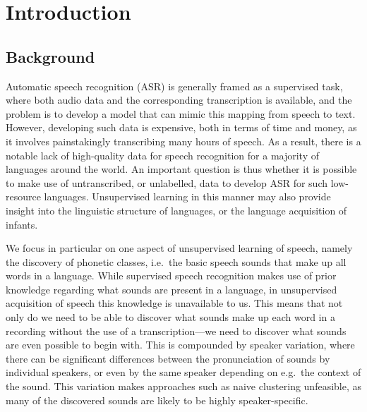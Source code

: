 %
%
%

\chapter{Introduction}
\section{Background}
Automatic speech recognition (ASR) is generally framed as a supervised task, where both audio data and the corresponding transcription is available, and the problem is to develop a model that can mimic this mapping from speech to text.
However, developing such data is expensive, both in terms of time and money, as it involves painstakingly transcribing many hours of speech.
As a result, there is a notable lack of high-quality data for speech recognition for a majority of languages around the world.
An important question is thus whether it is possible to make use of untranscribed, or unlabelled, data to develop ASR for such low-resource languages.
Unsupervised learning in this manner may also provide insight into the linguistic structure of languages, or the language acquisition of infants.

We focus in particular on one aspect of unsupervised learning of speech, namely the discovery of phonetic classes, i.e.\ the basic speech sounds that make up all words in a language.
While supervised speech recognition makes use of prior knowledge regarding what sounds are present in a language, in unsupervised acquisition of speech this knowledge is unavailable to us.
This means that not only do we need to be able to discover what sounds make up each word in a recording without the use of a transcription---we need to discover what sounds are even possible to begin with.
This is compounded by speaker variation, where there can be significant differences between the pronunciation of sounds by individual speakers, or even by the same speaker depending on e.g.\ the context of the sound.
This variation makes approaches such as naive clustering unfeasible, as many of the discovered sounds are likely to be highly speaker-specific.

